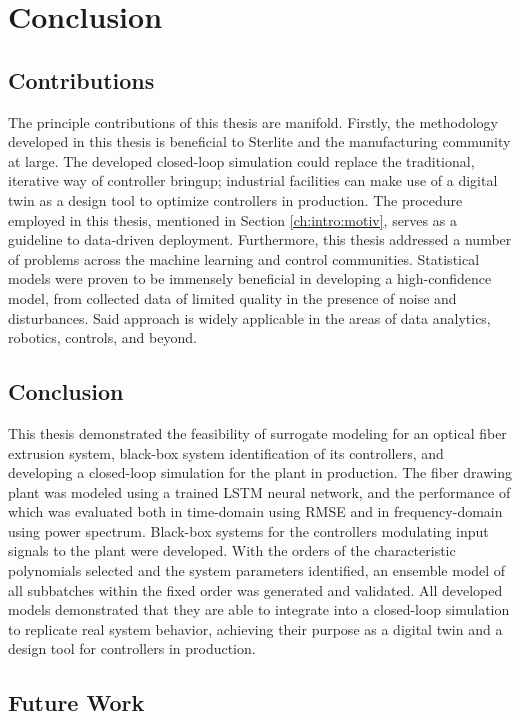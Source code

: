 \chapter{Conclusion}

\section{Contributions}

The principle contributions of this thesis are manifold. Firstly, the methodology developed in this thesis is beneficial to Sterlite and the manufacturing community at large. The developed closed-loop simulation could replace the traditional, iterative way of controller bringup; industrial facilities can make use of a digital twin as a design tool to optimize controllers in production. The procedure employed in this thesis, mentioned in Section \ref{ch:intro:motiv}, serves as a guideline to data-driven deployment. Furthermore, this thesis addressed a number of problems across the machine learning and control communities. Statistical models were proven to be immensely beneficial in developing a high-confidence model, from collected data of limited quality in the presence of noise and disturbances. Said approach is widely applicable in the areas of data analytics, robotics, controls, and beyond. 

\section{Conclusion}

This thesis demonstrated the feasibility of surrogate modeling for an optical fiber extrusion system, black-box system identification of its controllers, and developing a closed-loop simulation for the plant in production. The fiber drawing plant was modeled using a trained LSTM neural network, and the performance of which was evaluated both in time-domain using RMSE and in frequency-domain using power spectrum. Black-box systems for the controllers modulating input signals to the plant were developed. With the orders of the characteristic polynomials selected and the system parameters identified, an ensemble model of all subbatches within the fixed order was generated and validated. All developed models demonstrated that they are able to integrate into a closed-loop simulation to replicate real system behavior, achieving their purpose as a digital twin and a design tool for controllers in production. 


\section{Future Work} \label{ch:concl:future_work}

